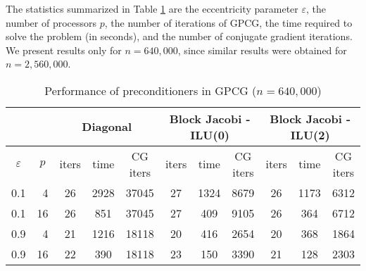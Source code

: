 The statistics summarized in Table \ref{preconditioners}
are the eccentricity parameter $ \varepsilon$,
the number of processors $p$,
the number of iterations of GPCG,
the time required to solve the problem (in seconds),
and the number of conjugate gradient iterations.
We present results only for $ n = 640,000 $, since similar
results were obtained for $ n = 2,560,000 $.

\begin{table}[htbp]
\caption{Performance of preconditioners in GPCG ($ n = 640,000 $)}
\label{preconditioners}
\begin{center}
\footnotesize
\begin{tabular}{| c r | c c c | c c c | c c c |}
\cline{3-11}
\multicolumn{2}{c}{} &
\multicolumn{3}{|c|}{Diagonal} &
\multicolumn{3}{c|}{Block Jacobi - ILU(0)} &
\multicolumn{3}{c|}{Block Jacobi - ILU(2)} \\
\hline
\multicolumn{1}{|c}{$ \varepsilon $} & 
\multicolumn{1}{c|}{$ p $} & 
\multicolumn{1}{c}{iters} &
\multicolumn{1}{c}{time} & 
\multicolumn{1}{c|}{CG iters} & 
\multicolumn{1}{c}{iters} &
\multicolumn{1}{c}{time} & 
\multicolumn{1}{c|}{CG iters} & 
\multicolumn{1}{c}{iters} &
\multicolumn{1}{c}{time} &
\multicolumn{1}{c|}{CG iters} \\ \hline
 0.1 &  4 & 26 & 2928 & 37045 & 27  & 1324 & 8679  & 26 & 1173 & 6312 \\
 0.1 & 16 & 26 & 851  & 37045 & 27  & 409  & 9105  & 26 & 364 & 6712 \\
\hline                                             
 0.9 &  4 & 21 & 1216 & 18118 & 20 & 416  & 2654 & 20 & 368 & 1864\\
 0.9 & 16 & 22 & 390  & 18118 & 23 & 150  & 3390 & 21 & 128 & 2303\\

\hline
\end{tabular}
\end{center}
\end{table}

